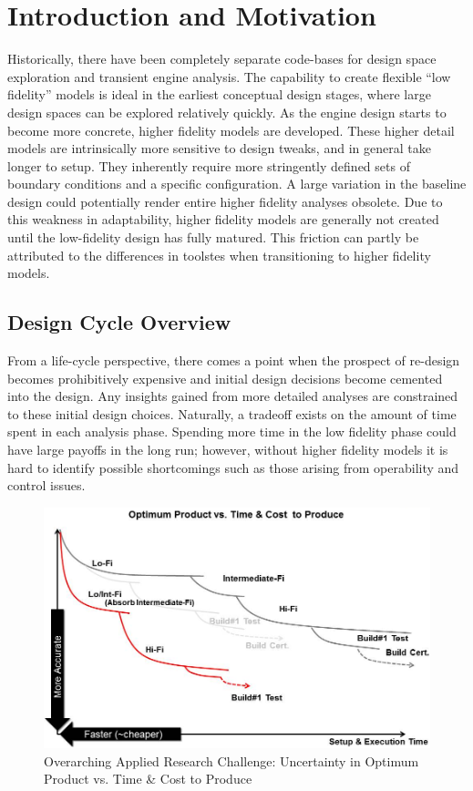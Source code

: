 \documentclass[heading.tex]{subfiles}
\begin{document}

\section{Introduction and Motivation}
Historically, there have been completely separate code-bases for design space exploration and transient engine analysis. The capability to create flexible ``low fidelity'' models is ideal in the earliest  conceptual design stages, where large design spaces can be explored relatively quickly. As the engine design starts to become more concrete, higher fidelity models are developed. These higher detail models are intrinsically more sensitive to design tweaks, and in general take longer to setup. They inherently require more stringently defined sets of boundary conditions and a specific configuration. A large variation in the baseline design could potentially render entire higher fidelity analyses obsolete. Due to this weakness in adaptability, higher fidelity models are generally not created until the low-fidelity design has fully matured. This friction can partly be attributed to the differences in toolstes when transitioning to higher fidelity models. 

\subsection{Design Cycle Overview}

	From a life-cycle perspective, there comes a point when the prospect of re-design becomes prohibitively expensive and initial design decisions become cemented into the design.  Any insights gained from more detailed analyses are constrained to these initial design choices. Naturally, a tradeoff exists on the amount of time spent in each analysis phase. Spending more time in the low fidelity phase could have large payoffs in the long run; however, without higher fidelity models it is hard to identify possible shortcomings such as those arising from operability and control issues.

\begin{figure}[H]
\centering
\includegraphics[width=1.0\textwidth]{images/optimum_product_vs_time}
\caption{Overarching Applied Research Challenge: Uncertainty in Optimum Product vs. Time \& Cost to Produce}
\label{f:product_vs_time}
\end{figure}
\end{document}
